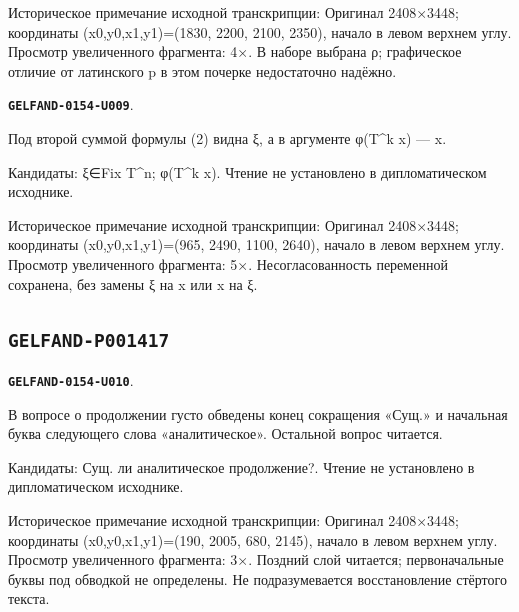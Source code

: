 \documentclass[11pt]{article}
\theoremstyle{definition}
\theoremstyle{remark}
\begin{document}
Историческое примечание исходной транскрипции: Оригинал 2408×3448; координаты (x0,y0,x1,y1)=(1830, 2200, 2100, 2350), начало в левом верхнем углу. Просмотр увеличенного фрагмента: 4×. В наборе выбрана ρ; графическое отличие от латинского p в этом почерке недостаточно надёжно.\par\medskip
\par\noindent\leavevmode{}\label{GELFAND-0154-U009}\label{GELFAND-P001416:eq2-variable:note}\textbf{\texttt{GELFAND-0154-U009}}.\nopagebreak[4]\par
Под второй суммой формулы (2) видна ξ, а в аргументе φ(T\textasciicircum{}k x) — x.\par
Кандидаты: ξ∈Fix T\textasciicircum{}n; φ(T\textasciicircum{}k x). Чтение не установлено в дипломатическом исходнике.\par
Историческое примечание исходной транскрипции: Оригинал 2408×3448; координаты (x0,y0,x1,y1)=(965, 2490, 1100, 2640), начало в левом верхнем углу. Просмотр увеличенного фрагмента: 5×. Несогласованность переменной сохранена, без замены ξ на x или x на ξ.\par\medskip
\subsection*{\texttt{GELFAND-P001417}}
\par\noindent\leavevmode{}\label{GELFAND-0154-U010}\label{GELFAND-P001417:continuation-question-overwriting:note}\textbf{\texttt{GELFAND-0154-U010}}.\nopagebreak[4]\par
В вопросе о продолжении густо обведены конец сокращения «Сущ.» и начальная буква следующего слова «аналитическое». Остальной вопрос читается.\par
Кандидаты: Сущ. ли аналитическое продолжение?. Чтение не установлено в дипломатическом исходнике.\par
Историческое примечание исходной транскрипции: Оригинал 2408×3448; координаты (x0,y0,x1,y1)=(190, 2005, 680, 2145), начало в левом верхнем углу. Просмотр увеличенного фрагмента: 3×. Поздний слой читается; первоначальные буквы под обводкой не определены. Не подразумевается восстановление стёртого текста.\par\medskip
\end{document}
